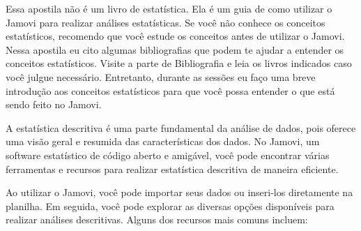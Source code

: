 \begin{tcolorbox}[colback=white,colframe=green,title= Dica de Conteúdo]
    Essa apostila não é um livro de estatística. Ela é um guia de como utilizar o Jamovi para realizar análises estatísticas. Se você não conhece os conceitos estatísticos, recomendo que você estude os conceitos antes de utilizar o Jamovi. Nessa apostila eu cito algumas bibliografias que podem te ajudar a entender os conceitos estatísticos. Visite a parte de Bibliografia e leia os livros indicados caso você julgue necessário. Entretanto, durante as sessões eu faço uma breve introdução aos conceitos estatísticos para que você possa entender o que está sendo feito no Jamovi.
  \end{tcolorbox}

A estatística descritiva é uma parte fundamental da análise de dados, pois oferece uma visão geral e resumida das características dos dados. No Jamovi, um software estatístico de código aberto e amigável, você pode encontrar várias ferramentas e recursos para realizar estatística descritiva de maneira eficiente.

Ao utilizar o Jamovi, você pode importar seus dados ou inseri-los diretamente na planilha. Em seguida, você pode explorar as diversas opções disponíveis para realizar análises descritivas. Alguns dos recursos mais comuns incluem:

